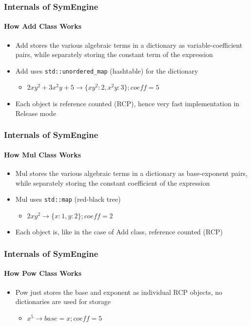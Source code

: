 \documentclass{beamer}
\begin{document}
\begin{frame}
\frametitle{Internals of SymEngine}
\framesubtitle{How Add Class Works}
\begin{itemize}
    \item Add stores the various algebraic terms in a dictionary as variable-coefficient 
        pairs, while separately storing the constant term of the expression
    \item Add uses \texttt{std::unordered\_map} (hashtable) for the dictionary
        \begin{itemize}
            \item $2xy^2+3x^2y + 5\to \{xy^2: 2, x^2y: 3\}; coeff=5 $
        \end{itemize}
    \item Each object is reference counted (RCP), hence very fast implementation in
        Release mode
\end{itemize}
\end{frame}


\begin{frame}
\frametitle{Internals of SymEngine}
\framesubtitle{How Mul Class Works}
\begin{itemize}
    \item Mul stores the various algebraic terms in a dictionary as base-exponent 
        pairs, while separately storing the constant coefficient of the expression
    \item Mul uses \texttt{std::map} (red-black tree)
        \begin{itemize}
            \item $2 xy^2 \to \{x: 1, y:2\}; coeff=2$
        \end{itemize}
    \item Each object is, like in the case of Add class, reference counted (RCP)
\end{itemize}
\end{frame}


\begin{frame}
\frametitle{Internals of SymEngine}
\framesubtitle{How Pow Class Works}
\begin{itemize}
    \item Pow just stores the base and exponent as individual RCP objects, no dictionaries are used for storage
        \begin{itemize}
            \item $ x^5 \to base=x; coeff=5$
        \end{itemize} 
\end{itemize}
\end{frame}
\end{document}

